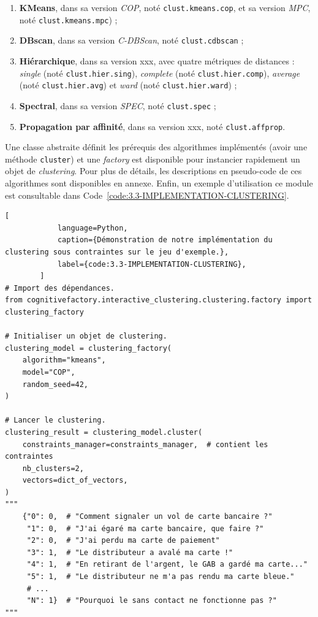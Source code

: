 		\begin{enumerate}
			\item \textbf{KMeans}, dans sa version \textit{COP}, noté \texttt{clust.kmeans.cop}, et sa version \textit{MPC}, noté \texttt{clust.kmeans.mpc}) ;
			\item \textbf{DBscan}, dans sa version \textit{C-DBScan}, noté \texttt{clust.cdbscan} ;
			\item \textbf{Hiérarchique}, dans sa version xxx, avec quatre métriques de distances : \textit{single} (noté \texttt{clust.hier.sing}), \textit{complete} (noté \texttt{clust.hier.comp}), \textit{average} (noté \texttt{clust.hier.avg}) et \textit{ward} (noté \texttt{clust.hier.ward}) ;
			\item \textbf{Spectral}, dans sa version \textit{SPEC}, noté \texttt{clust.spec} ;
			\item \textbf{Propagation par affinité}, dans sa version xxx, noté \texttt{clust.affprop}.
		\end{enumerate}
		
		Une classe abstraite définit les prérequis des algorithmes implémentés (avoir une méthode \texttt{cluster}) et une \textit{factory} est disponible pour instancier rapidement un objet de \textit{clustering}.
		Pour plus de détails, les descriptions en pseudo-code de ces algorithmes sont disponibles en annexe.
		Enfin, un exemple d'utilisation ce module est consultable dans Code~\ref{code:3.3-IMPLEMENTATION-CLUSTERING}.
		
		
		\begin{lstlisting}[
			language=Python,
			caption={Démonstration de notre implémentation du clustering sous contraintes sur le jeu d'exemple.},
			label={code:3.3-IMPLEMENTATION-CLUSTERING},
		]
# Import des dépendances.
from cognitivefactory.interactive_clustering.clustering.factory import clustering_factory

# Initialiser un objet de clustering.
clustering_model = clustering_factory(
    algorithm="kmeans",
	model="COP",
    random_seed=42,
)

# Lancer le clustering.
clustering_result = clustering_model.cluster(
    constraints_manager=constraints_manager,  # contient les contraintes
    nb_clusters=2,
    vectors=dict_of_vectors,
)
"""
    {"0": 0,  # "Comment signaler un vol de carte bancaire ?"
     "1": 0,  # "J'ai égaré ma carte bancaire, que faire ?"
     "2": 0,  # "J'ai perdu ma carte de paiement"
     "3": 1,  # "Le distributeur a avalé ma carte !"
     "4": 1,  # "En retirant de l'argent, le GAB a gardé ma carte..."
     "5": 1,  # "Le distributeur ne m'a pas rendu ma carte bleue."
     # ...
     "N": 1}  # "Pourquoi le sans contact ne fonctionne pas ?"
"""
		\end{lstlisting}
		
